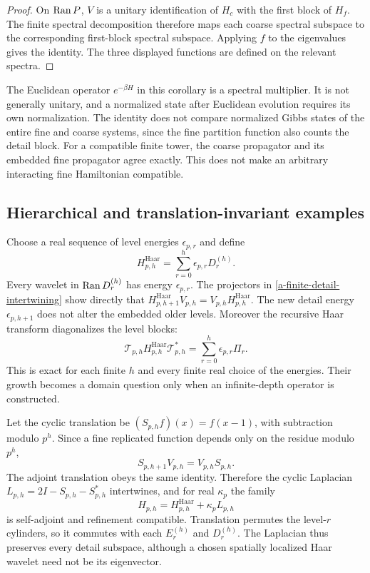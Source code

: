 \begin{proof}
On $\operatorname{Ran} P$, $V$ is a unitary identification of $H_c$ with the
first block of $H_f$. The finite spectral decomposition therefore
maps each coarse spectral subspace to the corresponding first-block
spectral subspace. Applying $f$ to the eigenvalues gives the identity.
The three displayed functions are defined on the relevant spectra.
\end{proof}

The Euclidean operator $e^{-\beta H}$ in this corollary is a spectral
multiplier. It is not generally unitary, and a normalized state after
Euclidean evolution requires its own normalization. The identity does
not compare normalized Gibbs states of the entire fine and coarse
systems, since the fine partition function also counts the detail
block. For a compatible finite tower, the coarse propagator and its
embedded fine propagator agree exactly. This does not make an arbitrary
interacting fine Hamiltonian compatible.

\subsection{Hierarchical and translation-invariant examples}

Choose a real sequence of level energies $\epsilon_{p,r}$ and define
\begin{equation}
 H_{p,h}^{\mathrm{Haar}}=\sum_{r=0}^h
          \epsilon_{p,r}D_r^{(h)}.
 \label{a-finite-hierarchical-hamiltonian}
\end{equation}
Every wavelet in $\operatorname{Ran} D_r^{(h)}$ has energy $\epsilon_{p,r}$.
The projectors in \eqref{a-finite-detail-intertwining} show directly
that $H_{p,h+1}^{\mathrm{Haar}}V_{p,h}
=V_{p,h}H_{p,h}^{\mathrm{Haar}}$. The new detail energy
$\epsilon_{p,h+1}$ does not alter the embedded older levels.
Moreover the recursive Haar transform diagonalizes the level blocks:
\[
 \mathcal T_{p,h}H_{p,h}^{\mathrm{Haar}}\mathcal T_{p,h}^*
 =\sum_{r=0}^h\epsilon_{p,r}\Pi_r.
\]
This is exact for each finite $h$ and every finite real choice of the
energies. Their growth becomes a domain question only when an
infinite-depth operator is constructed.

Let the cyclic translation be $(S_{p,h}f)(x)=f(x-1)$, with
subtraction modulo $p^h$. Since a fine replicated function depends only
on the residue modulo $p^h$,
\[
 S_{p,h+1}V_{p,h}=V_{p,h}S_{p,h}.
\]
The adjoint translation obeys the same identity. Therefore the cyclic
Laplacian $L_{p,h}=2I-S_{p,h}-S_{p,h}^*$ intertwines, and for real
$\kappa_p$ the family
\begin{equation}
 H_{p,h}=H_{p,h}^{\mathrm{Haar}}+\kappa_p L_{p,h}
 \label{a-finite-compatible-laplacian}
\end{equation}
is self-adjoint and refinement compatible. Translation permutes the
level-$r$ cylinders, so it commutes with each $E_r^{(h)}$ and
$D_r^{(h)}$. The Laplacian thus preserves every detail subspace,
although a chosen spatially localized Haar wavelet need not be its
eigenvector.

